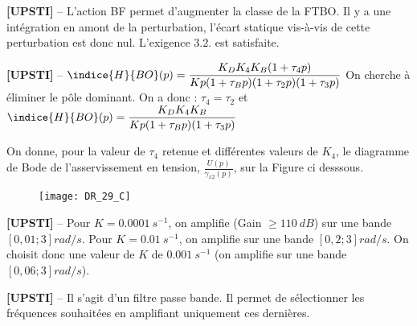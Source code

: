 \ifprof
\begin{corrige}%
\textbf{[UPSTI]} -- L’action BF permet d’augmenter la classe de la FTBO. Il y a une intégration en amont de la perturbation, l’écart statique vis-à-vis de cette perturbation est donc nul. L’exigence 3.2. est satisfaite.
\end{corrige}
\else
\fi

\ifprof
\begin{corrige}%
\textbf{[UPSTI]} -- 
$\indice{H}{BO} (p)=\dfrac{K_D K_4 K_B (1+\tau_4 p)}{Kp(1+\tau_B p)(1+\tau_2 p)(1+\tau_3 p)}$
On cherche à éliminer le pôle dominant. On a donc : $\tau_4=\tau_2$ et  
$\indice{H}{BO} (p)=\dfrac{K_D K_4 K_B}{Kp(1+\tau_B p)(1+\tau_3 p)}$

\end{corrige}
\else
\fi

\ifprof
\else
On donne, pour la valeur de $\tau_{4}$ retenue et différentes valeurs de $K_{4}$, le diagramme de Bode de l'asservissement en tension, $\frac{U(p)}{\gamma_{x 2}(p)}$, sur la Figure ci desssous. %
\fi

\ifprof
\else
\begin{figure}[!h]
\centering
\texttt{[image: DR\_29\_C]}
\end{figure}
\fi

\ifprof
\begin{corrige}%
\textbf{[UPSTI]} --
Pour $K = \SI{0,0001}{s^{-1}}$, on amplifie (Gain $\geq \SI{110}{dB}$) sur une bande $\left[0,01 ; 3\right] \si{rad/s}$.
Pour $K = \SI{0,01}{s^{-1}}$, on amplifie sur une bande $\left[0,2 ; 3\right] \si{rad/s}$.
On choisit donc une valeur de $K$ de $\SI{0,001}{s^{-1}}$ (on amplifie sur une bande $\left[0,06 ; 3\right] \si{rad/s}$).

\end{corrige}
\else
\fi

\ifprof
\begin{corrige}%
\textbf{[UPSTI]} -- 
Il s’agit d’un filtre passe bande. Il permet de sélectionner les fréquences souhaitées en amplifiant uniquement ces dernières.
\end{corrige}
\else
\fi


